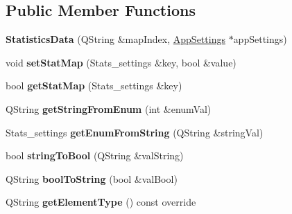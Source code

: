 \subsection*{Public Member Functions}
\begin{DoxyCompactItemize}
\item 
{\bfseries Statistics\+Data} (Q\+String \&map\+Index, \hyperlink{class_app_settings}{App\+Settings} $\ast$app\+Settings)\hypertarget{class_statistics_data_a64f53a2d5da890724c5e53062f1ac621}{}\label{class_statistics_data_a64f53a2d5da890724c5e53062f1ac621}

\item 
void {\bfseries set\+Stat\+Map} (Stats\+\_\+settings \&key, bool \&value)\hypertarget{class_statistics_data_ae6a517912ddb6cd3bb575591ab229352}{}\label{class_statistics_data_ae6a517912ddb6cd3bb575591ab229352}

\item 
bool {\bfseries get\+Stat\+Map} (Stats\+\_\+settings \&key)\hypertarget{class_statistics_data_adc57d3e9085d9a5b23fb029dff56e47b}{}\label{class_statistics_data_adc57d3e9085d9a5b23fb029dff56e47b}

\item 
Q\+String {\bfseries get\+String\+From\+Enum} (int \&enum\+Val)\hypertarget{class_statistics_data_abc4c3d3d8a3f96ef2d49908116786e5a}{}\label{class_statistics_data_abc4c3d3d8a3f96ef2d49908116786e5a}

\item 
Stats\+\_\+settings {\bfseries get\+Enum\+From\+String} (Q\+String \&string\+Val)\hypertarget{class_statistics_data_ab750449fe157f8462c360d885d0daca7}{}\label{class_statistics_data_ab750449fe157f8462c360d885d0daca7}

\item 
bool {\bfseries string\+To\+Bool} (Q\+String \&val\+String)\hypertarget{class_statistics_data_a92dd8629f3b459d1f659c1cc4d887d98}{}\label{class_statistics_data_a92dd8629f3b459d1f659c1cc4d887d98}

\item 
Q\+String {\bfseries bool\+To\+String} (bool \&val\+Bool)\hypertarget{class_statistics_data_a4b37dd3758c5b0a2957d9cca7a5adc51}{}\label{class_statistics_data_a4b37dd3758c5b0a2957d9cca7a5adc51}

\item 
Q\+String {\bfseries get\+Element\+Type} () const override\hypertarget{class_statistics_data_a93b9f3bbcff86d79d229457f9a35b02f}{}\label{class_statistics_data_a93b9f3bbcff86d79d229457f9a35b02f}


\end{DoxyCompactItemize}
